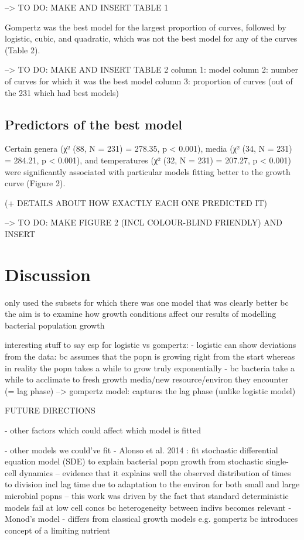 \documentclass[11pt]{article}
\begin{document}
	--> TO DO: MAKE AND INSERT TABLE 1
	
	Gompertz was the best model for the largest proportion of curves, followed by logistic, cubic, and quadratic, which was not the best model for any of the curves (Table 2).
	
	--> TO DO: MAKE AND INSERT TABLE 2
	column 1: model 
	column 2: number of curves for which it was the best model
	column 3: proportion of curves (out of the 231 which had best models)
	
	\subsection{Predictors of the best model}
	
	Certain genera (χ² (88, N = 231) = 278.35, p < 0.001), media (χ² (34, N = 231) = 284.21, p < 0.001), and temperatures (χ² (32, N = 231) = 207.27, p < 0.001) were significantly associated with particular models fitting better to the growth curve (Figure 2). 
	
	(+ DETAILS ABOUT HOW EXACTLY EACH ONE PREDICTED IT)
	
	--> TO DO: MAKE FIGURE 2 (INCL COLOUR-BLIND FRIENDLY) AND INSERT
	
	
	
	
	\section{Discussion}
	
	only used the subsets for which there was one model that was clearly better bc the aim is to examine how growth conditions affect our results of modelling bacterial population growth
	
	
	
	interesting stuff to say esp for logistic vs gompertz:
	- logistic can show deviations from the data: bc assumes that the popn is growing right from the start whereas in reality the popn takes a while to grow truly exponentially
	- bc bacteria take a while to acclimate to fresh growth media/new resource/environ they encounter (= lag phase)
	--> gompertz model: captures the lag phase (unlike logistic model)
	
	
	
	
	FUTURE DIRECTIONS
	
	- other factors which could affect which model is fitted
	
	- other models we could've fit
	- Alonso et al. 2014 \cite{alonso2014modeling}: fit stochastic differential equation model (SDE) to explain bacterial popn growth from stochastic single-cell dynamics -- evidence that it explains well the observed distribution of times to division incl lag time due to adaptation to the environ for both small and large microbial popns -- this work was driven by the fact that standard deterministic models fail at low cell concs bc heterogeneity between indivs becomes relevant
	- Monod's model \cite{lobry1992monod} - differs from classical growth models e.g. gompertz bc introduces concept of a limiting nutrient
	
\end{document}
